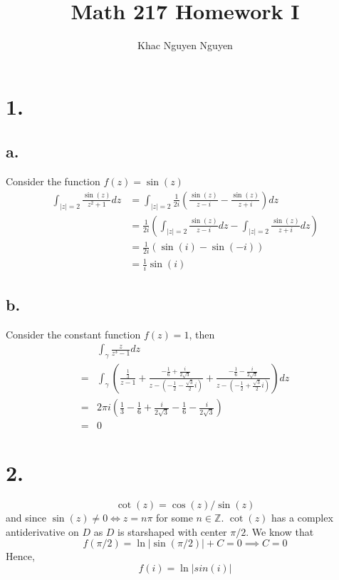 \documentclass[11pt]{article}
\title{\textbf{Math 217 Homework I}}
\author{Khac Nguyen Nguyen}
\date{}
\begin{document}
\section*{1.}
\subsection*{a.}
Consider the function $f(z) = \sin(z)$
\begin{equation*}
    \begin{aligned}
        \int_{|z|=2} \frac{\sin(z)}{z^2+1} dz 
        &= \int_{|z|=2} \frac{1}{2i}\left(\frac{\sin(z)}{z-i} - \frac{\sin(z)}{z+i}\right) dz \\
        &= \frac{1}{2i} \left(\int_{|z|=2}\frac{\sin(z)}{z-i}dz - \int_{|z|=2} \frac{\sin(z)}{z+i}dz\right) \\
        &= \frac{1}{2i} \left(\sin(i) - \sin(-i)\right) \\
        &= \frac{1}{i} \sin(i)
    \end{aligned}
\end{equation*} 
\subsection*{b.}
Consider the constant function $f(z) = 1$, then
\begin{equation*}
    \begin{aligned}
        &\int_\gamma \frac{z}{z^3-1} dz \\
        =& \int_\gamma \left( \frac{\frac{1}{3}}{z-1} + \frac{-\frac{1}{6} + \frac{i}{2\sqrt{3}}}{z - \left(-\frac{1}{2}-\frac{\sqrt{3}}{2}i\right)} + \frac{-\frac{1}{6} - \frac{i}{2\sqrt{3}}}{z - \left(-\frac{1}{2} +\frac{\sqrt{3}}{2}i\right)} \right) dz \\
        =& 2\pi i \left(\frac{1}{3} - \frac{1}{6} + \frac{i}{2\sqrt{3}} - \frac{1}{6} - \frac{i}{2\sqrt{3}} \right) \\
        =& 0
    \end{aligned}
\end{equation*}
\newpage
\section*{2.}
\[
    \cot(z) = \cos(z) / \sin(z)    
\]
and since $\sin(z) \ne 0 \iff z = n\pi$ for some $n \in \mathbb{Z}$. 
$\cot(z)$ has a complex antiderivative on $D$ as $D$ is starshaped with center $\pi/2$.
We know that 
\[
    f(\pi / 2) = \ln|\sin(\pi/2) | + C = 0 \implies C = 0    
\]
Hence, 
\[
    f(i) = \ln|sin(i)|    
\]
\newpage
\end{document}
